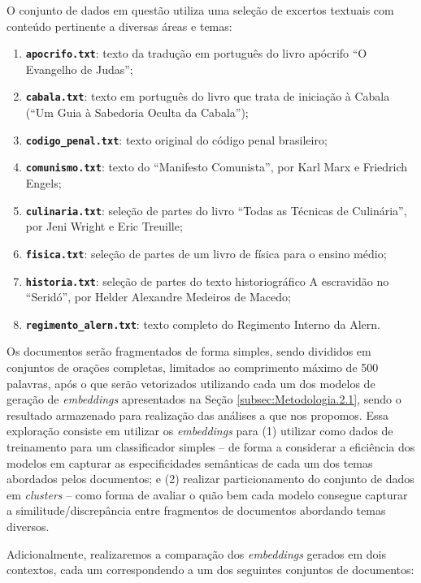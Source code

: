 O conjunto de dados em questão utiliza uma seleção de excertos textuais com conteúdo pertinente a diversas áreas e temas:

\begin{enumerate}
    \item \textbf{\texttt{apocrifo.txt}}: texto da tradução em português do livro apócrifo ``O Evangelho de Judas'';
    \item \textbf{\texttt{cabala.txt}}: texto em português do livro que trata de iniciação à Cabala (``Um Guia à Sabedoria Oculta da Cabala'');
    \item \textbf{\texttt{codigo\_penal.txt}}: texto original do código penal brasileiro;
    \item \textbf{\texttt{comunismo.txt}}: texto do ``Manifesto Comunista'', por Karl Marx e Friedrich Engels;
    \item \textbf{\texttt{culinaria.txt}}: seleção de partes do livro ``Todas as Técnicas de Culinária'', por Jeni Wright e Eric Treuille;
    \item \textbf{\texttt{fisica.txt}}: seleção de partes de um livro de física para o ensino médio;
    \item \textbf{\texttt{historia.txt}}: seleção de partes do texto historiográfico A escravidão no ``Seridó'', por Helder Alexandre Medeiros de Macedo;
    \item \textbf{\texttt{regimento\_alern.txt}}: texto completo do Regimento Interno da Alern.
\end{enumerate}

Os documentos serão fragmentados de forma simples, sendo divididos em conjuntos de orações completas, limitados ao comprimento máximo de 500 palavras, após o que serão vetorizados utilizando cada um dos modelos de geração de \textit{embeddings} apresentados na Seção \ref{subsec:Metodologia.2.1}, sendo o resultado armazenado para realização das análises a que nos propomos. Essa exploração consiste em utilizar os \textit{embeddings} para (1) utilizar como dados de treinamento para um classificador simples -- de forma a considerar a eficiência dos modelos em capturar as especificidades semânticas de cada um dos temas abordados pelos documentos; e (2) realizar particionamento do conjunto de dados em \textit{clusters} -- como forma de avaliar o quão bem cada modelo consegue capturar a similitude/discrepância entre fragmentos de documentos abordando temas diversos.

Adicionalmente, realizaremos a comparação dos \textit{embeddings} gerados em dois contextos, cada um correspondendo a um dos seguintes conjuntos de documentos:

